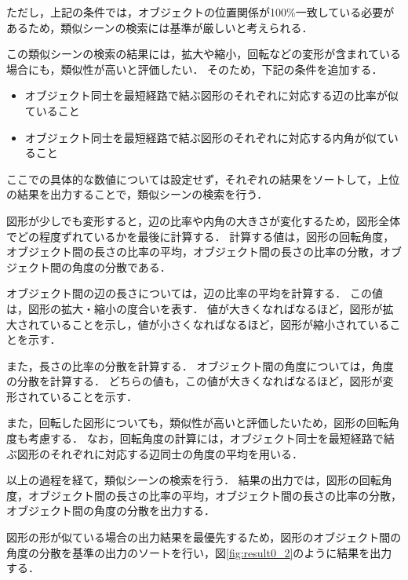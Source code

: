 \documentclass[a4j,12pt,dvipdfmx]{jreport}
\begin{document}
ただし，上記の条件では，オブジェクトの位置関係が100\%一致している必要があるため，類似シーンの検索には基準が厳しいと考えられる．

この類似シーンの検索の結果には，拡大や縮小，回転などの変形が含まれている場合にも，類似性が高いと評価したい．
そのため，下記の条件を追加する．
\begin{itemize}
  \item オブジェクト同士を最短経路で結ぶ図形のそれぞれに対応する辺の比率が似ていること
  \item オブジェクト同士を最短経路で結ぶ図形のそれぞれに対応する内角が似ていること
\end{itemize}
ここでの具体的な数値については設定せず，それぞれの結果をソートして，上位の結果を出力することで，類似シーンの検索を行う．

図形が少しでも変形すると，辺の比率や内角の大きさが変化するため，図形全体でどの程度ずれているかを最後に計算する．
計算する値は，図形の回転角度，オブジェクト間の長さの比率の平均，オブジェクト間の長さの比率の分散，オブジェクト間の角度の分散である．

オブジェクト間の辺の長さについては，辺の比率の平均を計算する．
この値は，図形の拡大・縮小の度合いを表す．
値が大きくなればなるほど，図形が拡大されていることを示し，値が小さくなればなるほど，図形が縮小されていることを示す．

また，長さの比率の分散を計算する．
オブジェクト間の角度については，角度の分散を計算する．
どちらの値も，この値が大きくなればなるほど，図形が変形されていることを示す．

また，回転した図形についても，類似性が高いと評価したいため，図形の回転角度も考慮する．
なお，回転角度の計算には，オブジェクト同士を最短経路で結ぶ図形のそれぞれに対応する辺同士の角度の平均を用いる．

以上の過程を経て，類似シーンの検索を行う．
結果の出力では，図形の回転角度，オブジェクト間の長さの比率の平均，オブジェクト間の長さの比率の分散，オブジェクト間の角度の分散を出力する．

図形の形が似ている場合の出力結果を最優先するため，図形のオブジェクト間の角度の分散を基準の出力のソートを行い，図\ref{fig:result0_2}のように結果を出力する．
\end{document}
